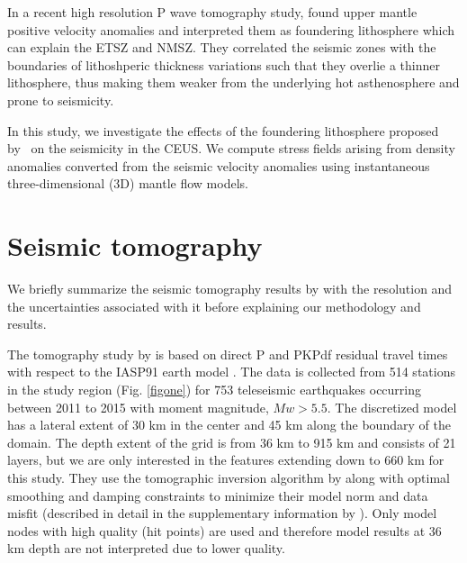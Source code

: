 \documentclass[draft,linenumbers]{agujournal2018}
\begin{document}
    In a recent high resolution P wave tomography study, \citet{Biryol_2016} found upper mantle positive velocity anomalies and interpreted them as foundering lithosphere which can explain the ETSZ and NMSZ. They correlated the seismic zones with the boundaries of lithoshperic thickness variations such that they overlie a thinner lithosphere, thus making them weaker from the underlying hot asthenosphere and prone to seismicity.
    
    In this study, we investigate the effects of the foundering lithosphere proposed by~\citet{Biryol_2016} on the seismicity in the CEUS. We compute stress fields arising from density anomalies converted from the seismic velocity anomalies using instantaneous three-dimensional (3D) mantle flow models. 

\section{Seismic tomography}
We briefly summarize the seismic tomography results by \citet{Biryol_2016} with the resolution and the uncertainties associated with it before explaining our methodology and results.

    The tomography study by \citet{Biryol_2016} is based on direct P and PKPdf residual travel times with respect to the IASP91 earth model \citep{kennett1991traveltimes}. The data is collected from 514 stations in the study region (Fig. \ref{figone}) for 753 teleseismic earthquakes occurring between 2011 to 2015 with moment magnitude, $Mw > 5.5$. The discretized model has a lateral extent of 30 km in the center and 45 km along the boundary of the domain. The depth extent of the grid is from 36 km to 915 km and consists of 21 layers, but we are only interested in the features extending down to 660 km for this study. They use the tomographic inversion algorithm by \citet{schmandt2010seismic} along with optimal smoothing and damping constraints to minimize their model norm and data misfit (described in detail in the supplementary information by \citet{Biryol_2016}). Only model nodes with high quality (hit points) are used and therefore model results at 36 km depth are not interpreted due to lower quality.
    
\end{document}
